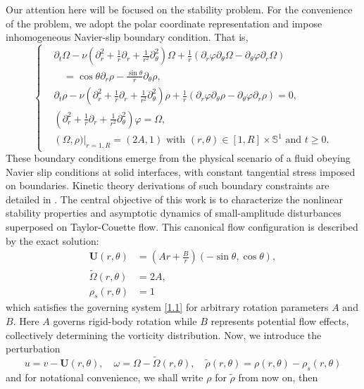 \documentclass[final, 12pt,reqno]{amsart}
\numberwithin{equation}{section}
\begin{document}
Our attention here will be focused on the stability problem. For the
convenience of the problem, we adopt the polar coordinate
representation and impose inhomogeneous Navier-slip boundary
condition. That is,
\begin{equation}\label{1.3}
    \left\{
\begin{aligned}
    &   \partial_t \Omega-\nu \left(\partial_r^2+\frac{1}{r} \partial_r+\frac{1}{r^2} \partial_\theta^2\right)\Omega+\frac{1}{r}\left(\partial_r \varphi \partial_\theta \Omega-\partial_\theta \varphi \partial_r \Omega\right)\\
    &\quad=\cos\theta\partial_{r}\rho-\frac{\sin\theta}{r}\partial_{\theta}\rho, \\
    &\partial_t \rho-\nu\left(\partial_r^2+\frac{1}{r} \partial_r+\frac{1}{r^2} \partial_\theta^2\right) \rho+\frac{1}{r}\left(\partial_r \varphi \partial_\theta \rho-\partial_\theta \varphi \partial_r \rho\right)=0, \\
&   \left(\partial_r^2+\frac{1}{r} \partial_r+\frac{1}{r^2} \partial_\theta^2\right) \varphi=\Omega,\\
&\left (\Omega,\rho)\right|_{r=1, R}=(2A,1)
\text { with }(r, \theta) \in[1, R] \times \mathbb{S}^1 \text { and } t \geq 0.
    \end{aligned}
\right.
\end{equation}
These boundary conditions emerge from the physical scenario of a fluid obeying Navier slip conditions at solid interfaces, 
with constant tangential stress imposed on boundaries. 
Kinetic theory derivations of such boundary constraints are detailed in \cite{Masmoudi.202301}. The central objective of this work is to characterize the nonlinear stability properties 
and asymptotic dynamics of small-amplitude disturbances superposed on Taylor-Couette flow. 
This canonical flow configuration is described by the exact solution:
\begin{align*}
\mathbf{U}(r,\theta) &= \left(Ar + \frac{B}{r}\right) (-\sin\theta, \cos\theta),\\
\widetilde{\Omega}(r,\theta) &= 2A, \\
\rho_s(r,\theta) &= 1
\end{align*}
which satisfies the governing system \eqref{1.1} for arbitrary rotation parameters $A$ and $B$. 
Here $A$ governs rigid-body rotation while $B$ represents potential flow effects, 
collectively determining the vorticity distribution.
Now, we introduce  the perturbation
$$u=v-\mathbf{U}(r,\theta),\quad \omega=\Omega-\tilde{\Omega}(r,\theta),\quad \tilde{\rho}(r,\theta)=\rho(r,\theta)-\rho_s(r,\theta)$$ and  for notational convenience, we shall write $\rho$ for $\tilde{\rho}$ from now on, then
\end{document}
